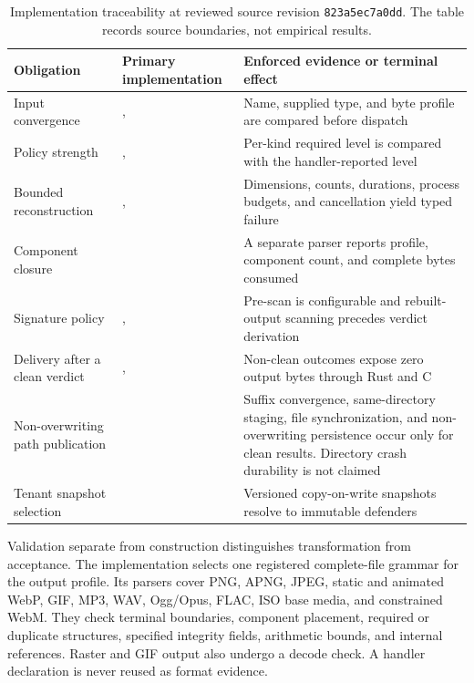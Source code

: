 \begin{table}[t]
\centering
\caption{Implementation traceability at reviewed source revision
\texttt{823a5ec7a0dd}. The table records source boundaries, not empirical
results.}
\label{tab:implementation-traceability}
\footnotesize
\begin{tabularx}{\textwidth}{L{0.22\textwidth}L{0.34\textwidth}Y}
\toprule
Obligation & Primary implementation & Enforced evidence or terminal effect \\
\midrule
Input convergence & ,  & Name, supplied type, and byte profile are compared before dispatch \\
Policy strength & ,  & Per-kind required level is compared with the handler-reported level \\
Bounded reconstruction & ,  & Dimensions, counts, durations, process budgets, and cancellation yield typed failure \\
Component closure &  & A separate parser reports profile, component count, and complete bytes consumed \\
Signature policy & ,  & Pre-scan is configurable and rebuilt-output scanning precedes verdict derivation \\
Delivery after a clean verdict & ,  & Non-clean outcomes expose zero output bytes through Rust and C \\
Non-overwriting path publication &  & Suffix convergence, same-directory staging, file synchronization, and non-overwriting persistence occur only for clean results. Directory crash durability is not claimed \\
Tenant snapshot selection &  & Versioned copy-on-write snapshots resolve to immutable defenders \\
\bottomrule
\end{tabularx}
\end{table}

Validation separate from construction distinguishes transformation from
acceptance. The implementation selects one registered complete-file grammar for
the output profile. Its parsers cover PNG, APNG, JPEG, static and animated WebP,
GIF, MP3, WAV, Ogg/Opus, FLAC, ISO base media, and constrained WebM. They check
terminal boundaries, component placement, required or duplicate structures,
specified integrity fields, arithmetic bounds, and internal references. Raster
and GIF output also undergo a decode check. A handler declaration is never
reused as format evidence.

